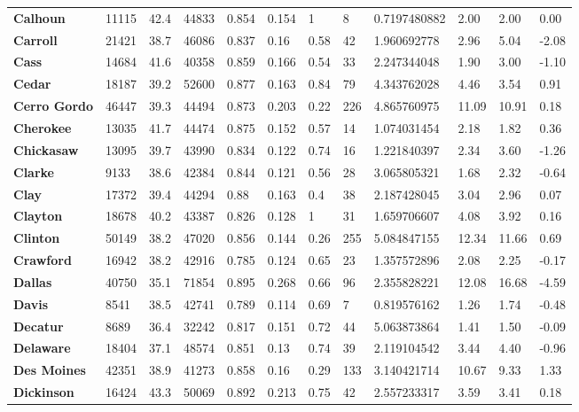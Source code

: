 \documentclass[11pt]{article}
\begin{document}
\begin{table}[H]
\begin{tabular}{llllllllllll}
\textbf{Calhoun} & 11115 & 42.4 & 44833 & 0.854 & 0.154 & 1 & 8 & 0.7197480882 & 2.00 & 2.00 & 0.00 \\
\textbf{Carroll} & 21421 & 38.7 & 46086 & 0.837 & 0.16 & 0.58 & 42 & 1.960692778 & 2.96 & 5.04 & -2.08 \\
\textbf{Cass} & 14684 & 41.6 & 40358 & 0.859 & 0.166 & 0.54 & 33 & 2.247344048 & 1.90 & 3.00 & -1.10 \\
\textbf{Cedar} & 18187 & 39.2 & 52600 & 0.877 & 0.163 & 0.84 & 79 & 4.343762028 & 4.46 & 3.54 & 0.91 \\
\textbf{Cerro Gordo} & 46447 & 39.3 & 44494 & 0.873 & 0.203 & 0.22 & 226 & 4.865760975 & 11.09 & 10.91 & 0.18 \\
\textbf{Cherokee} & 13035 & 41.7 & 44474 & 0.875 & 0.152 & 0.57 & 14 & 1.074031454 & 2.18 & 1.82 & 0.36 \\
\textbf{Chickasaw} & 13095 & 39.7 & 43990 & 0.834 & 0.122 & 0.74 & 16 & 1.221840397 & 2.34 & 3.60 & -1.26 \\
\textbf{Clarke} & 9133 & 38.6 & 42384 & 0.844 & 0.121 & 0.56 & 28 & 3.065805321 & 1.68 & 2.32 & -0.64 \\
\textbf{Clay} & 17372 & 39.4 & 44294 & 0.88 & 0.163 & 0.4 & 38 & 2.187428045 & 3.04 & 2.96 & 0.07 \\
\textbf{Clayton} & 18678 & 40.2 & 43387 & 0.826 & 0.128 & 1 & 31 & 1.659706607 & 4.08 & 3.92 & 0.16 \\
\textbf{Clinton} & 50149 & 38.2 & 47020 & 0.856 & 0.144 & 0.26 & 255 & 5.084847155 & 12.34 & 11.66 & 0.69 \\
\textbf{Crawford} & 16942 & 38.2 & 42916 & 0.785 & 0.124 & 0.65 & 23 & 1.357572896 & 2.08 & 2.25 & -0.17 \\
\textbf{Dallas} & 40750 & 35.1 & 71854 & 0.895 & 0.268 & 0.66 & 96 & 2.355828221 & 12.08 & 16.68 & -4.59 \\
\textbf{Davis} & 8541 & 38.5 & 42741 & 0.789 & 0.114 & 0.69 & 7 & 0.819576162 & 1.26 & 1.74 & -0.48 \\
\textbf{Decatur} & 8689 & 36.4 & 32242 & 0.817 & 0.151 & 0.72 & 44 & 5.063873864 & 1.41 & 1.50 & -0.09 \\
\textbf{Delaware} & 18404 & 37.1 & 48574 & 0.851 & 0.13 & 0.74 & 39 & 2.119104542 & 3.44 & 4.40 & -0.96 \\
\textbf{Des Moines} & 42351 & 38.9 & 41273 & 0.858 & 0.16 & 0.29 & 133 & 3.140421714 & 10.67 & 9.33 & 1.33 \\
\textbf{Dickinson} & 16424 & 43.3 & 50069 & 0.892 & 0.213 & 0.75 & 42 & 2.557233317 & 3.59 & 3.41 & 0.18 \\

\end{tabular}
\end{table}
\end{document}
